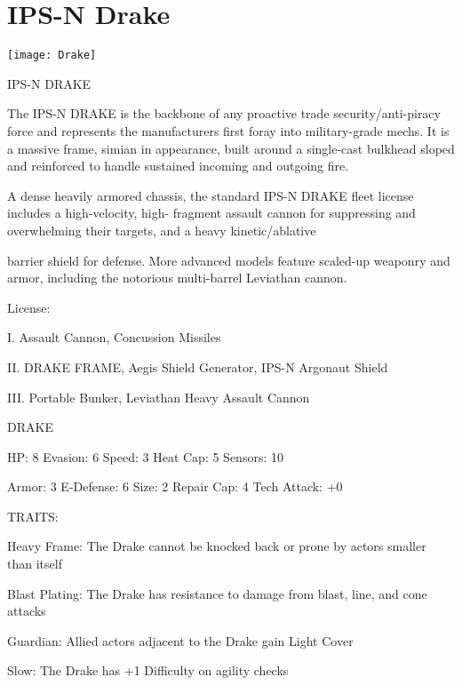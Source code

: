 \section{IPS-N Drake}

\texttt{[image: Drake]}


                                                    IPS-N DRAKE

The IPS-N DRAKE is the backbone of any proactive trade security/anti-piracy force and represents the
manufacturers first foray into military-grade mechs. It is a massive frame, simian in appearance, built
around a single-cast bulkhead sloped and reinforced to handle sustained incoming and outgoing fire.

A dense heavily armored chassis, the standard IPS-N DRAKE fleet license includes a high-velocity, high-
fragment assault cannon for suppressing and overwhelming their targets, and a heavy kinetic/ablative

barrier shield for defense. More advanced models feature scaled-up weaponry and armor, including the
notorious multi-barrel Leviathan cannon.




                                                     License:

I. Assault Cannon, Concussion Missiles

II. DRAKE FRAME, Aegis Shield Generator, IPS-N Argonaut Shield

III. Portable Bunker, Leviathan Heavy Assault Cannon


                                                     DRAKE

  HP: 8           Evasion: 6                             Speed: 3            Heat Cap: 5        Sensors: 10

  Armor: 3        E-Defense: 6                           Size: 2             Repair Cap: 4      Tech Attack:
                                                                                                +0

                                                     TRAITS:

  Heavy Frame: The Drake cannot be knocked back or prone by actors smaller than itself

  Blast Plating: The Drake has resistance to damage from blast, line, and cone attacks

  Guardian: Allied actors adjacent to the Drake gain Light Cover

  Slow: The Drake has +1 Difficulty on agility checks

